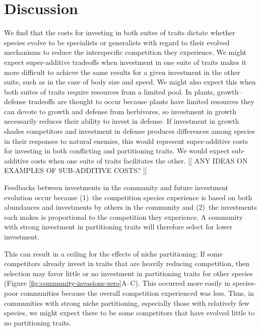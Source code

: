 
\section*{Discussion}


We find that the costs for investing in both suites of traits dictate whether
species evolve to be specialists or generalists with regard to their evolved
mechanisms to reduce the interspecific competition they experience.
We might expect super-additive tradeoffs when investment in one suite of
traits makes it more difficult to achieve the same results for a given
investment in the other suite, such as in the case of body size and speed.
We might also expect this when both suites of traits require resources from a
limited pool.
In plants, growth--defense tradeoffs are thought to occur because plants 
have limited resources they can devote to growth and defense from herbivores, 
so investment in growth necessarily reduces their ability to invest in defense.
If investment in growth shades competitors and investment in defense produces
differences among species in their responses to natural enemies, this would
represent super-additive costs for investing in both conflicting and 
partitioning traits.
We would expect sub-additive costs when one suite of traits facilitates 
the other.
[[ ANY IDEAS ON EXAMPLES OF SUB-ADDITIVE COSTS? ]]



Feedbacks between investments in the community and future investment 
evolution occur because
(1)~the competition species experience is based on both abundances 
and investments by others in the community and
(2)~the investments each makes is proportional to the competition 
they experience.
A community with strong investment in partitioning traits will therefore 
select for lower investment.

This can result in a ceiling for the effects of niche partitioning:
If some competitors already invest in traits that are heavily reducing
competition, then selection may favor little or no investment in
partitioning traits for other species
(Figure \ref{fig:community-invasions-zero}A--C).
This occurred more easily in species-poor communities because the 
overall competition experienced was less.
Thus, in communities with strong niche partitioning,
especially those with relatively few species, we might
expect there to be some competitors that have evolved
little to no partitioning traits.



